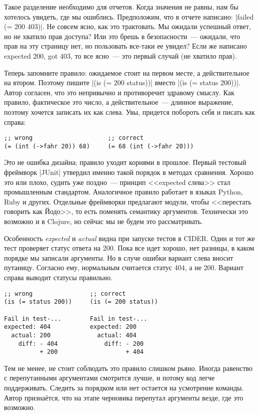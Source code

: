 Такое разделение необходимо для отчетов. Когда значения не равны, нам бы
хотелось увидеть, где мы ошиблись. Предположим, что в отчете написано:
\spverb|failed (= 200 403)|. Не совсем ясно, как это трактовать. Мы ожидали
успешный ответ, но не хватило прав доступа? Или это брешь в безопасности~---
ожидали, что прав на эту страницу нет, но пользовать все-таки ее увидел? Если же
написано expected 200, got 403, то все ясно~--- это первый случай (не хватило
прав).

Теперь запомните правило: ожидаемое стоит на первом месте, а действительное на
втором. Поэтому пишите \spverb|(is (= 200 status))| вместо \spverb|(is (= status 200))|. Автор
согласен, что это непривычно и противоречит здравому смыслу. Как правило,
фактическое это число, а действительное~--- длинное выражение, поэтому хочется
записать их как слева. Увы, придется побороть себя и писать как справа:

\begin{verbatim}
;; wrong                     ;; correct
(= (int (->fahr 20)) 68)     (= 68 (int (->fahr 20)))
\end{verbatim}

Это не ошибка дизайна; правило уходит корнями в прошлое. Первый тестовый
фреймворк \spverb|JUnit| утвердил именно такой порядок в методах сравнения. Хорошо это
или плохо, судить уже поздно~--- принцип <<expected слева>> стал промышленным
стандартом. Аналогичное правило работает в языках Python, Ruby и
других. Отдельные фреймворки предлагают модули, чтобы <<перестать говорить как
Йодо>>, то есть поменять семантику аргументов. Технически это возможно и в
Clojure, но сейчас мы не будем это рассматривать.

Особенность \emph{expected} и \emph{actual} видна при запуске тестов в
CIDER. Один и тот же тест проверяет статус ответа на 200. Пока все идет хорошо,
нет разницы, в каком порядке мы записали аргументы. Но в случе ошибки вариант
слева вносит путаницу. Согласно ему, нормальным считается статус 404, а не
200. Вариант справа выводит статусы правильно.

\begin{verbatim}
;; wrong                ;; correct
(is (= status 200))     (is (= 200 status))

Fail in test-...        Fail in test-...
expected: 404           expected: 200
  actual: 200             actual: 404
    diff: - 404             diff: - 200
          + 200                   + 404
\end{verbatim}

Тем не менее, не стоит соблюдать это правило слишком рьяно. Иногда равенство с
перепутанными аргументами смотрится лучше, и потому код легче
поддерживать. Следить за порядком или нет остается на усмотрение команды. Автор
признаётся, что на этапе черновика перепутал аргументы везде, где это возможно.
